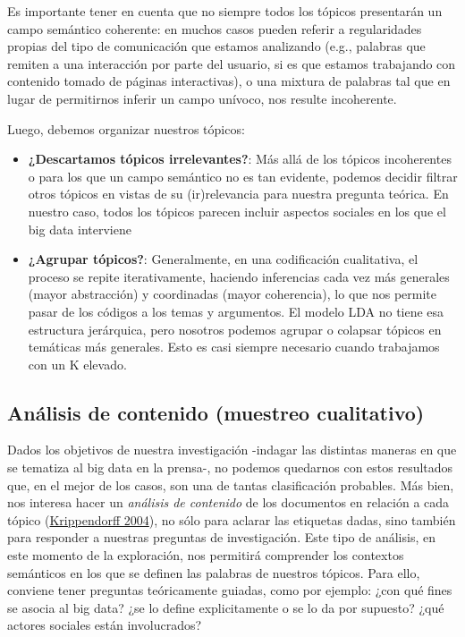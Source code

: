 \documentclass[
]{book}
\begin{document}
Es importante tener en cuenta que no siempre todos los tópicos presentarán un campo semántico coherente: en muchos casos pueden referir a regularidades propias del tipo de comunicación que estamos analizando (e.g., palabras que remiten a una interacción por parte del usuario, si es que estamos trabajando con contenido tomado de páginas interactivas), o una mixtura de palabras tal que en lugar de permitirnos inferir un campo unívoco, nos resulte incoherente.

Luego, debemos organizar nuestros tópicos:

\begin{itemize}
\item
  \textbf{¿Descartamos tópicos irrelevantes?}: Más allá de los tópicos incoherentes o para los que un campo semántico no es tan evidente, podemos decidir filtrar otros tópicos en vistas de su (ir)relevancia para nuestra pregunta teórica. En nuestro caso, todos los tópicos parecen incluir aspectos sociales en los que el big data interviene
\item
  \textbf{¿Agrupar tópicos?}: Generalmente, en una codificación cualitativa, el proceso se repite iterativamente, haciendo inferencias cada vez más generales (mayor abstracción) y coordinadas (mayor coherencia), lo que nos permite pasar de los códigos a los temas y argumentos. El modelo LDA no tiene esa estructura jerárquica, pero nosotros podemos agrupar o colapsar tópicos en temáticas más generales. Esto es casi siempre necesario cuando trabajamos con un K elevado.
\end{itemize}

\hypertarget{anuxe1lisis-de-contenido-muestreo-cualitativo}{%
\subsection{Análisis de contenido (muestreo cualitativo)}\label{anuxe1lisis-de-contenido-muestreo-cualitativo}}

Dados los objetivos de nuestra investigación -indagar las distintas maneras en que se tematiza al big data en la prensa-, no podemos quedarnos con estos resultados que, en el mejor de los casos, son una de tantas clasificación probables. Más bien, nos interesa hacer un \emph{análisis de contenido} de los documentos en relación a cada tópico (\protect\hyperlink{ref-Krippendorff2004}{Krippendorff 2004}), no sólo para aclarar las etiquetas dadas, sino también para responder a nuestras preguntas de investigación. Este tipo de análisis, en este momento de la exploración, nos permitirá comprender los contextos semánticos en los que se definen las palabras de nuestros tópicos. Para ello, conviene tener preguntas teóricamente guiadas, como por ejemplo: ¿con qué fines se asocia al big data? ¿se lo define explicitamente o se lo da por supuesto? ¿qué actores sociales están involucrados?
\end{document}
